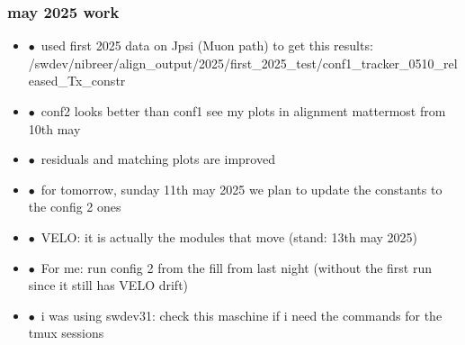 \documentclass[aspectratio=1610, 12pt, xcolor=dvipsnames]{beamer}
\begin{document}
\begin{frame}\frametitle{may 2025 work}
  \begin{itemize}
    \item $\bullet$\, used first 2025 data on Jpsi (Muon path) to get this results: /swdev/nibreer/align_output/2025/first_2025_test/conf1_tracker_0510_released_Tx_constr
    \item $\bullet$\, conf2 looks better than conf1 see my plots in alignment mattermost from 10th may
    \item $\bullet$\, residuals and matching plots are improved
    \item $\bullet$\, for tomorrow, sunday 11th may 2025 we plan to update the constants to the config 2 ones
    \item $\bullet$\, VELO: it is actually the modules that move (stand: 13th may 2025)
    \item $\bullet$\, For me: run config 2 from the fill from last night (without the first run since it still has VELO drift)
    \item $\bullet$\, i was using swdev31: check this maschine if i need the commands for the tmux sessions
  \end{itemize}
\end{frame}
\end{document}
